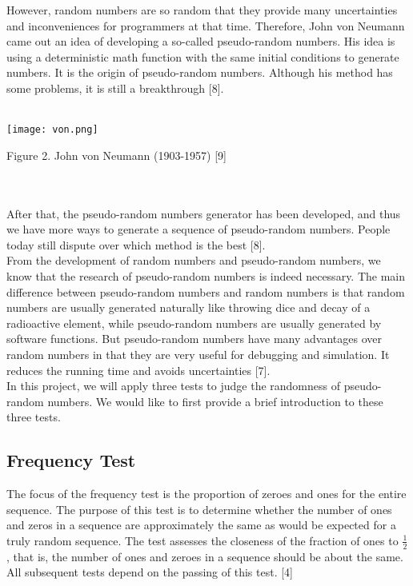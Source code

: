 \documentclass[a4paper,12pt]{article}
\begin{document}
\noindent However, random numbers are so random that they provide many uncertainties and inconveniences for programmers at that time. Therefore, John von Neumann came out an idea of developing a so-called pseudo-random numbers. His idea is  using a deterministic math function with the same initial conditions to generate numbers. It is the origin of pseudo-random numbers. Although his method has some problems, it is still a breakthrough [8].\\\\
\centerline{\texttt{[image: von.png]}}
\centerline{Figure 2. John von Neumann (1903-1957) [9]}
\noindent \\\\After that, the pseudo-random numbers generator has been developed, and thus we have more ways to generate a sequence of pseudo-random numbers. People today still dispute over which method is the best [8]. \\

\noindent From the development of random numbers and pseudo-random numbers, we know that the research of pseudo-random numbers is indeed necessary. The main difference between pseudo-random numbers and random numbers is that random numbers are usually generated naturally like throwing dice and decay of a radioactive element, while pseudo-random numbers are usually generated by software functions. But pseudo-random numbers have many advantages over random numbers in that they are very useful for debugging and simulation. It reduces the running time and avoids uncertainties [7].\\


\noindent In this project, we will apply three tests to judge the randomness of pseudo-random numbers. We would like to first provide a brief introduction to these three tests.
\subsection{Frequency Test}
\noindent The focus of the frequency test is the proportion of zeroes and ones for the entire sequence. The purpose of this test is to determine whether the number of ones and zeros in a sequence are approximately the same as would be expected for a truly random sequence. The test assesses the closeness of the fraction of ones to $\frac{1}{2}$, that is, the number of ones and zeroes in a sequence should be about the same. All subsequent tests depend on the passing of this test. [4]
\end{document}
